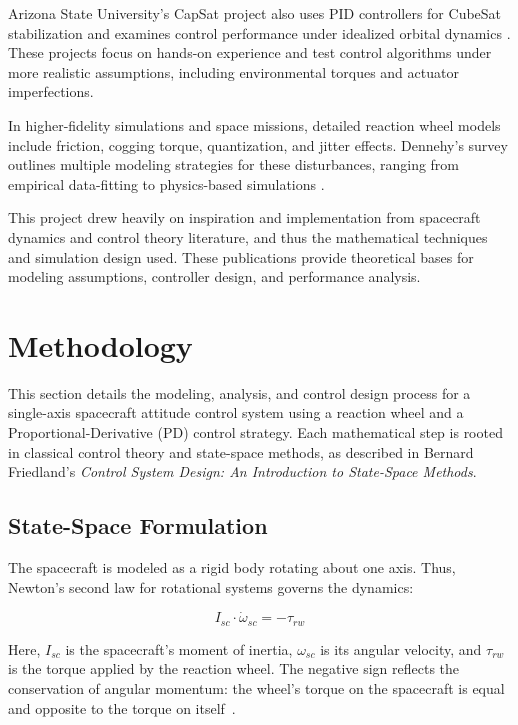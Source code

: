 \documentclass{ifacconf}
\begin{document}
Arizona State University's CapSat project also uses PID controllers for CubeSat stabilization and examines control performance under idealized orbital dynamics \citep{ASU2021}. These projects focus on hands-on experience and test control algorithms under more realistic assumptions, including environmental torques and actuator imperfections.

In higher-fidelity simulations and space missions, detailed reaction wheel models include friction, cogging torque, quantization, and jitter effects. Dennehy’s survey outlines multiple modeling strategies for these disturbances, ranging from empirical data-fitting to physics-based simulations \cite{Dennehy2004}. 


This project drew heavily on inspiration and implementation from spacecraft dynamics and control theory literature, and thus the mathematical techniques and simulation design used. These publications provide theoretical bases for modeling assumptions, controller design, and performance analysis.



\section{Methodology}

This section details the modeling, analysis, and control design process for a single-axis spacecraft attitude control system using a reaction wheel and a Proportional-Derivative (PD) control strategy. Each mathematical step is rooted in classical control theory and state-space methods, as described in Bernard Friedland's \textit{Control System Design: An Introduction to State-Space Methods}\citep{Friedland2005}.

\subsection{State-Space Formulation}

The spacecraft is modeled as a rigid body rotating about one axis. Thus, Newton's second law for rotational systems governs the dynamics:

\begin{equation}
I_{sc} \cdot \dot{\omega}_{sc} = -\tau_{rw}
\end{equation}

Here, $I_{sc}$ is the spacecraft's moment of inertia, $\omega_{sc}$ is its angular velocity, and $\tau_{rw}$ is the torque applied by the reaction wheel. The negative sign reflects the conservation of angular momentum: the wheel’s torque on the spacecraft is equal and opposite to the torque on itself~\cite{friedland2005control}.
\end{document}
